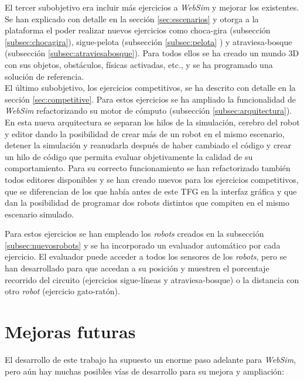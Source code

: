 El tercer subobjetivo era incluir más ejercicios a \textit{WebSim} y mejorar los existentes. Se han explicado con detalle en la sección \ref{sec:escenarios} y otorga a la plataforma el poder realizar nuevos ejercicios como choca-gira (subsección \ref{subsec:chocagira}), sigue-pelota (subsección \ref{subsec:pelota} ) y atraviesa-bosque (subsección \ref{subsec:atraviesabosque}).  Para todos ellos se ha creado un mundo 3D con sus objetos, obstáculos, físicas activadas, etc., y se ha programado una solución de referencia. \\

El último subobjetivo, los ejercicios competitivos, se ha descrito con detalle en la sección \ref{sec:competitive}. Para estos ejercicios se ha ampliado la funcionalidad de \textit{WebSim} refactorizando su motor de cómputo (subsección \ref{subsec:arquitectura}). En esta nueva arquitectura se separan los hilos de la simulación, cerebro del robot y editor dando la posibilidad de crear más de un robot en el mismo escenario, detener la simulación y reanudarla después de haber cambiado el código y crear un hilo de código que permita evaluar objetivamente la calidad de su comportamiento. Para su correcto funcionamiento se han refactorizado también todos editores disponibles y se han creado nuevos para los ejercicios competitivos, que se diferencian de los que había antes de este TFG en la interfaz gráfica y que dan la posibilidad de programar dos robots distintos que compiten en el mismo escenario simulado.

Para estos ejercicios se han empleado los \textit{robots} creados en la subsección \ref{subsec:nuevosrobots} y se ha incorporado un evaluador automático por cada ejercicio. El evaluador puede acceder a todos los sensores de los \textit{robots}, pero se han desarrollado para que accedan a su posición y muestren el porcentaje recorrido del circuito (ejercicios sigue-líneas y atraviesa-bosque) o la distancia con otro \textit{robot} (ejercicio gato-ratón). \\

\section{Mejoras futuras}
\label{sec:mejoras_futuras}

El desarrollo de este trabajo ha supuesto un enorme paso adelante para \textit{WebSim}, pero aún hay muchas posibles vías de desarrollo para su mejora y ampliación:

